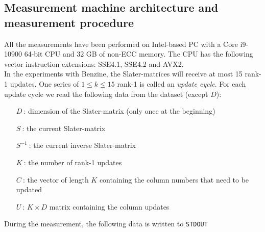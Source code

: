 \documentclass[11pt]{article}
\numberwithin{figure}{section}
\numberwithin{table}{section}
\begin{document}
    \subsection{Measurement machine architecture and measurement procedure}
      All the measurements have been performed on Intel-based PC with a Core i9-10900 64-bit CPU and 32 GB of non-ECC memory. The CPU has the following vector instruction extensions: SSE4.1, SSE4.2 and AVX2.\\
    
    	In the experiments with Benzine, the Slater-matrices will receive at most 15 rank-1 updates. One series of $1\leq k \leq15$ rank-1 is called an \emph{update cycle}. For each update cycle we read the following data from the dataset (except $D$):
    	\begin{itemize}
    		\item [$D\:$:] dimension of the Slater-matrix (only once at the beginning)
    		\item [$S\:$:] the current Slater-matrix
    		\item [$S^{-1}\:$:] the current inverse Slater-matrix
    		\item [$K\:$:] the number of rank-1 updates
    		\item [$C\:$:] the vector of length $K$ containing the column numbers that need to be updated
    		\item [$U\:$:] $K\times D$ matrix containing the column updates
    	\end{itemize}
    	During the measurement, the following data is written to \verb|STDOUT|
\end{document}
